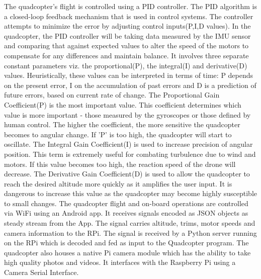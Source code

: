 \newline
\newline
The quadcopter's flight is controlled using a PID controller. The PID algorithm is a closed-loop feedback mechanism that is used in control systems. The controller attempts to minimize the error by adjusting control inputs(P,I,D values). In the quadcopter, the PID controller will be taking data measured by the IMU sensor and comparing that against expected values to alter the speed of the motors to compensate for any differences and maintain balance. It involves three separate constant parameters viz. the proportional(P), the integral(I) and derivative(D) values. Heuristically, these values can be interpreted in terms of time: P depends on the present error, I on the accumulation of past errors and D is a prediction of future errors, based on current rate of change.
\newline
\newline
The Proportional Gain Coefficient(P) is the most important value. This coefficient determines which value is more important - those measured by the gyroscopes or those defined by human control. The higher the coefficient, the more sensitive the quadcopter becomes to angular change. If 'P' is too high, the quadcopter will start to oscillate. 
\newline
\newline
The Integral Gain Coefficient(I) is used to increase precision of angular position. This term is extremely useful for combating turbulence due to wind and motors. If this value becomes too high, the reaction speed of the drone will decrease.
\newline
\newline
The Derivative Gain Coefficient(D) is used to allow the quadcopter to reach the desired altitude more quickly as it amplifies the user input. It is dangerous to increase this value as the quadcopter may become highly susceptible to small changes.
\newline
\newline
The quadcopter flight and on-board operations are controlled via WiFi using an Android app. It receives signals encoded as JSON objects as steady stream from the App. The signal carries altitude, trims, motor speeds and camera information to the RPi. The signal is received by a Python server running on the RPi which is decoded and fed as input to the Quadcopter program.  
\newline
\newline
The quadcopter also houses a native Pi camera module which has the ability to take high quality photos and videos. It interfaces with the Raspberry Pi using a Camera Serial Interface. 
